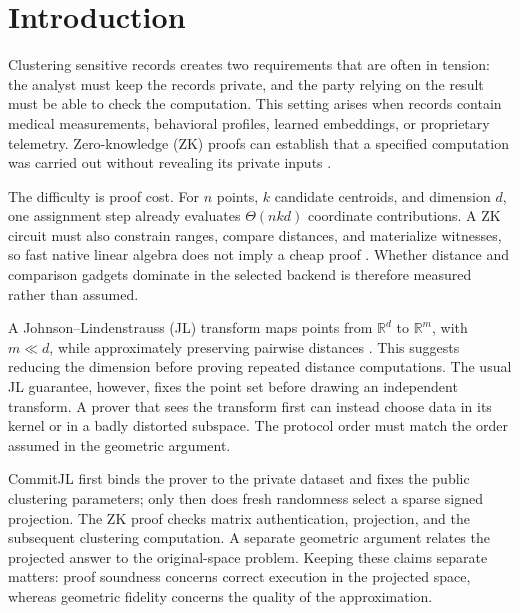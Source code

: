\documentclass[pdflatex,sn-mathphys-num,iicol]{sn-jnl}
\newcommand{\tpexplain}[1]{}
\theoremstyle{plain}
\theoremstyle{definition}
\theoremstyle{remark}
\begin{document}
\section{Introduction}\label{sec:introduction}

\tpexplain{Paragraph 1 --- establish the practical problem. Begin with private high-dimensional clustering as a recurring building block in outsourced analytics, biometric or medical analysis, fraud detection, and collaborative learning. End with the verification need; cite ZK and privacy-preserving analytics surveys.}
Clustering sensitive records creates two requirements that are often in tension: the analyst must keep the records private, and the party relying on the result must be able to check the computation. This setting arises when records contain medical measurements, behavioral profiles, learned embeddings, or proprietary telemetry. Zero-knowledge (ZK) proofs can establish that a specified computation was carried out without revealing its private inputs \cite{gmr1991knowledge,zkmlsurvey2026,zkcnn2021}.

\tpexplain{Paragraph 2 --- quantify the bottleneck. Explain why distances in dimension d are expensive and distinguish native computation from proving cost. Insert a motivating profile from the implemented backend.}
The difficulty is proof cost. For $n$ points, $k$ candidate centroids, and dimension $d$, one assignment step already evaluates $\Theta(nkd)$ coordinate contributions. A ZK circuit must also constrain ranges, compare distances, and materialize witnesses, so fast native linear algebra does not imply a cheap proof \cite{zkcnn2021,ezdps2023}. Whether distance and comparison gadgets dominate in the selected backend is therefore measured rather than assumed.

\tpexplain{Paragraph 3 --- introduce JL but immediately expose the security subtlety. The novelty setup is commit first, sample second.}
A Johnson--Lindenstrauss (JL) transform maps points from $\mathbb{R}^d$ to $\mathbb{R}^m$, with $m\ll d$, while approximately preserving pairwise distances \cite{johnson1984extensions,achlioptas2003database,kane2014sparser}. This suggests reducing the dimension before proving repeated distance computations. The usual JL guarantee, however, fixes the point set before drawing an independent transform. A prover that sees the transform first can instead choose data in its kernel or in a badly distorted subspace. The protocol order must match the order assumed in the geometric argument.

\tpexplain{Paragraph 4 --- one crisp system sentence and one crisp separation of guarantees. Name the system only after checking trademark/name collisions.}
CommitJL first binds the prover to the private dataset and fixes the public clustering parameters; only then does fresh randomness select a sparse signed projection. The ZK proof checks matrix authentication, projection, and the subsequent clustering computation. A separate geometric argument relates the projected answer to the original-space problem. Keeping these claims separate matters: proof soundness concerns correct execution in the projected space, whereas geometric fidelity concerns the quality of the approximation.
\end{document}
